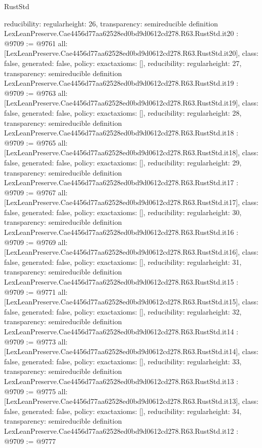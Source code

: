 \begin{lexlean}{RustStd}
\begin{coremodule}
{  reducibility: regular{height: 26},
  transparency: semireducible
}
definition LexLeanPreserve.Cae4456d77aa62528ed0bd9d0612cd278.R63.RustStd.it20 : @9709 := @9761 {
  all: [LexLeanPreserve.Cae4456d77aa62528ed0bd9d0612cd278.R63.RustStd.it20],
  class: false,
  generated: false,
  policy: exact{axioms: []},
  reducibility: regular{height: 27},
  transparency: semireducible
}
definition LexLeanPreserve.Cae4456d77aa62528ed0bd9d0612cd278.R63.RustStd.it19 : @9709 := @9763 {
  all: [LexLeanPreserve.Cae4456d77aa62528ed0bd9d0612cd278.R63.RustStd.it19],
  class: false,
  generated: false,
  policy: exact{axioms: []},
  reducibility: regular{height: 28},
  transparency: semireducible
}
definition LexLeanPreserve.Cae4456d77aa62528ed0bd9d0612cd278.R63.RustStd.it18 : @9709 := @9765 {
  all: [LexLeanPreserve.Cae4456d77aa62528ed0bd9d0612cd278.R63.RustStd.it18],
  class: false,
  generated: false,
  policy: exact{axioms: []},
  reducibility: regular{height: 29},
  transparency: semireducible
}
definition LexLeanPreserve.Cae4456d77aa62528ed0bd9d0612cd278.R63.RustStd.it17 : @9709 := @9767 {
  all: [LexLeanPreserve.Cae4456d77aa62528ed0bd9d0612cd278.R63.RustStd.it17],
  class: false,
  generated: false,
  policy: exact{axioms: []},
  reducibility: regular{height: 30},
  transparency: semireducible
}
definition LexLeanPreserve.Cae4456d77aa62528ed0bd9d0612cd278.R63.RustStd.it16 : @9709 := @9769 {
  all: [LexLeanPreserve.Cae4456d77aa62528ed0bd9d0612cd278.R63.RustStd.it16],
  class: false,
  generated: false,
  policy: exact{axioms: []},
  reducibility: regular{height: 31},
  transparency: semireducible
}
definition LexLeanPreserve.Cae4456d77aa62528ed0bd9d0612cd278.R63.RustStd.it15 : @9709 := @9771 {
  all: [LexLeanPreserve.Cae4456d77aa62528ed0bd9d0612cd278.R63.RustStd.it15],
  class: false,
  generated: false,
  policy: exact{axioms: []},
  reducibility: regular{height: 32},
  transparency: semireducible
}
definition LexLeanPreserve.Cae4456d77aa62528ed0bd9d0612cd278.R63.RustStd.it14 : @9709 := @9773 {
  all: [LexLeanPreserve.Cae4456d77aa62528ed0bd9d0612cd278.R63.RustStd.it14],
  class: false,
  generated: false,
  policy: exact{axioms: []},
  reducibility: regular{height: 33},
  transparency: semireducible
}
definition LexLeanPreserve.Cae4456d77aa62528ed0bd9d0612cd278.R63.RustStd.it13 : @9709 := @9775 {
  all: [LexLeanPreserve.Cae4456d77aa62528ed0bd9d0612cd278.R63.RustStd.it13],
  class: false,
  generated: false,
  policy: exact{axioms: []},
  reducibility: regular{height: 34},
  transparency: semireducible
}
definition LexLeanPreserve.Cae4456d77aa62528ed0bd9d0612cd278.R63.RustStd.it12 : @9709 := @9777 {
}
\end{coremodule}
\end{lexlean}
